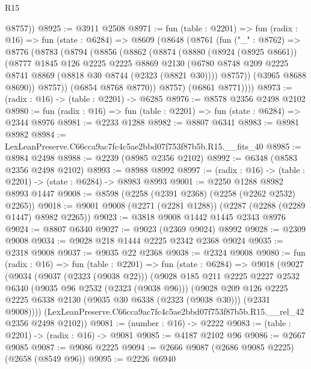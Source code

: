 \begin{lexlean}{R15}
\begin{coremodule}
        @8757))
@8925 := @3911 @2508
@8971 := fun (table : @2201) =>
  fun (radix : @16) =>
  fun (state : @6284) =>
  @8609
    (@8648
      (@8761
        (fun ("_" : @8762) =>
        @8776
          (@8783
            (@8794
              (@8856
                (@8862
                  (@8874
                    (@8880
                      (@8924 (@8925 @8661))
                      (@8777
                        @1845
                        @126
                        @2225
                        @2225
                        @8869
                        @2130
                        (@6780 @8748 @209 @2225 @8741 @8869 (@8818 @30 @8744 (@2323 (@8821 @30))))
                        @8757))
                    (@3965 @8688 @8690))
                  @8757))
              (@6854 @8768 @8770))
            @8757)
          (@6861 @8771))))
@8973 := (radix : @16) -> (table : @2201) -> @6285
@8976 := @8578 @2356 @2498 @2102
@8980 := fun (radix : @16) => fun (table : @2201) => fun (state : @6284) => @2344 @8976
@8981 := @2233 @1288
@8982 := @8807 @6341
@8983 := @8981 @8982
@8984 := LexLeanPreserve.C66cca9ac7fc4c5ae2bbd07f753f87b5b.R15.__fits_40
@8985 := @8984 @2498
@8988 := @2239 (@8985 @2356 @2102)
@8992 := @6348 (@8583 @2356 @2498 @2102)
@8993 := @8988 @8992
@8997 := (radix : @16) -> (table : @2201) -> (state : @6284) -> @8983 @8993
@9001 := @2250 @1288 @8982 @8993 @1447
@9008 := @8598 (@2258 (@2391 @2368) (@2258 (@2262 @2532) @2265))
@9018 := @9001 @9008 (@2271 (@2281 @1288)) (@2287 (@2288 (@2289 @1447) @8982 @2265))
@9023 := @3818 @9008 @1442 @1445 @2343 @8976
@9024 := @8807 @6340
@9027 := @9023 (@2369 @9024) @8992
@9028 := @2309 @9008
@9034 := @9028 @218 @1444 @2225 @2342 @2368 @9024
@9035 := @2318 @9008
@9037 := @9035 @22 @2368
@9038 := @2324 @9008
@9080 := fun (radix : @16) =>
  fun (table : @2201) =>
  fun (state : @6284) =>
  @9018
    (@9027
      (@9034
        (@9037 (@2323 (@9038 @22)))
        (@9028
          @185
          @211
          @2225
          @2227
          @2532
          @6340
          (@9035 @96 @2532 (@2323 (@9038 @96)))
          (@9028
            @209
            @126
            @2225
            @2225
            @6338
            @2130
            (@9035 @30 @6338 (@2323 (@9038 @30)))
            (@2331 @9008))))
      (LexLeanPreserve.C66cca9ac7fc4c5ae2bbd07f753f87b5b.R15.__rel_42 @2356 @2498 @2102))
@9081 := (number : @16) -> @2222
@9083 := (table : @2201) -> (radix : @16) -> @9081
@9085 := @4187 @2102 @96
@9086 := @2667 @9085
@9087 := @9086 @2225
@9094 := @2666 @9087 (@2686 @9085 @2225) (@2658 (@8549 @96))
@9095 := @2226 @6940

\end{coremodule}
\end{lexlean}
